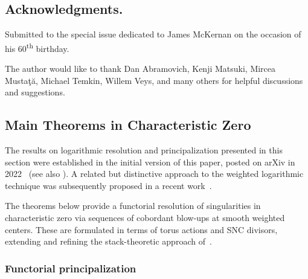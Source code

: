 \documentclass{amsart}
\begin{document}
\subsection*{Acknowledgments.} Submitted to the special issue dedicated to James McKernan on the occasion of his 60\textsuperscript{th} birthday.

The author would like to thank Dan Abramovich, Kenji Matsuki, Mircea Musta\c{t}\u{a}, Michael Temkin, Willem Veys, and many others for helpful discussions and suggestions. 
\subsection{Main Theorems in Characteristic Zero}

The results on logarithmic resolution and principalization presented in this section were  established in the initial version of this paper, posted on arXiv in 2022~\cite{W22} (see also \cite{W23}). A related but distinctive approach to the weighted logarithmic technique was subsequently proposed in a recent work~\cite{ABQTW}.

The theorems below provide a functorial resolution of singularities in characteristic zero via sequences of cobordant blow-ups at smooth weighted centers. These are formulated in terms of torus actions and SNC divisors, extending and refining the stack-theoretic approach of~\cite[Section 1.2]{ATW-weighted}.
\subsubsection{Functorial principalization}
\end{document}
